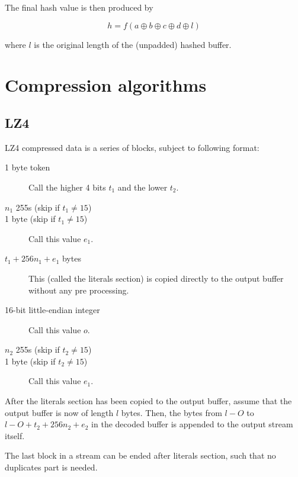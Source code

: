 \documentclass[11pt,a4paper]{report}
\begin{document}
        The final hash value is then produced by

        $$h = f(a \oplus b \oplus c \oplus d \oplus l) $$

        where $l$ is the original length of the (unpadded) hashed buffer.

    \section{Compression algorithms}
        \subsection{LZ4}
        \label{compression:lz4}
        LZ4 compressed data is a series of blocks, subject to following format:

        \begin{description}
            \item [1 byte token] Call the higher 4 bits $t_1$ and the lower $t_2$.
            \item [$n_1$ 255s (skip if $t_1 \neq 15$)]
            \item [1 byte (skip if $t_1 \neq 15$)] Call this value $e_1$.
            \item [$t_1 + 256n_1 + e_1$ bytes] This (called the literals
                section) is copied directly to the output buffer without any
                pre processing.
            \item [16-bit little-endian integer] Call this value $o$.
            \item [$n_2$ 255s (skip if $t_2 \neq 15$)]
            \item [1 byte (skip if $t_2 \neq 15$)] Call this value $e_1$.
        \end{description}

        After the literals section has been copied to the output buffer, assume
        that the output buffer is now of length $l$ bytes. Then, the bytes from
        $l - O$ to $l - O + t_2 + 256n_2 + e_2$ in the decoded buffer is
        appended to the output stream itself.

        The last block in a stream can be ended after literals section, such
        that no duplicates part is needed.
\end{document}
